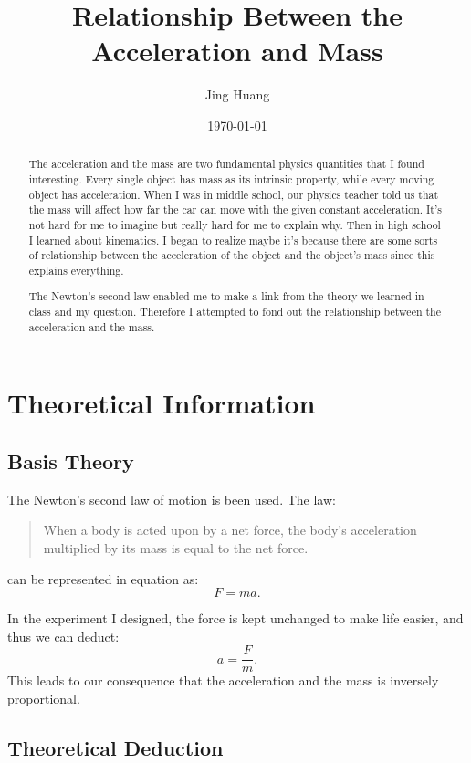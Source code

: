 \documentclass{article}
\begin{document}
\title{Relationship Between the Acceleration and Mass}
\author{Jing Huang}
\date{\today}
\maketitle

\begin{abstract}
  The acceleration and the mass are two fundamental physics quantities that I found interesting.
  Every single object has mass as its intrinsic property, while every moving object has acceleration.
  When I was in middle school, our physics teacher told us that the mass will affect how far the car can move with the given constant acceleration.
  It's not hard for me to imagine but really hard for me to explain why.
  Then in high school I learned about kinematics.
  I began to realize maybe it's because there are some sorts of relationship between the acceleration of the object and the object's mass since this explains everything.

  The Newton's second law enabled me to make a link from the theory we learned in class and my question.
  Therefore I attempted to fond out the relationship between the acceleration and the mass.
\end{abstract}

\section{Theoretical Information}

\subsection{Basis Theory}

The Newton's second law of motion is been used.
The law:
\begin{quote}
  When a body is acted upon by a net force, the body's acceleration multiplied by its mass is equal to the net force.
\end{quote}
can be represented in equation as:
\[
  F = ma.
\]

In the experiment I designed, the force is kept unchanged to make life easier, and thus we can deduct:
\[
  a = \frac{F}{m}.
\]
This leads to our consequence that the acceleration and the mass is inversely proportional.

\subsection{Theoretical Deduction}
\end{document}
